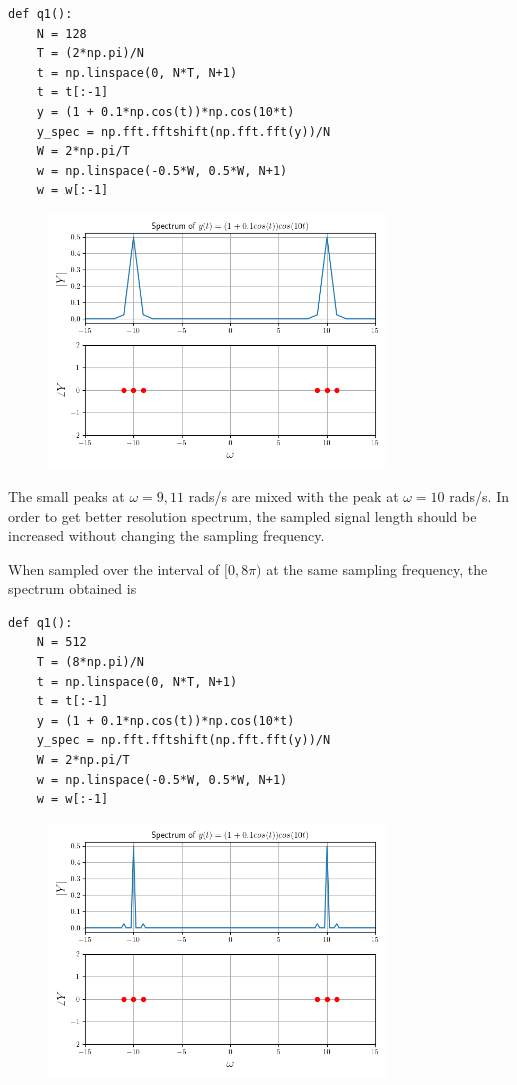 \documentclass[12pt, a4paper]{article}
\begin{document}
\begin{lstlisting}
def q1():
    N = 128
    T = (2*np.pi)/N
    t = np.linspace(0, N*T, N+1)
    t = t[:-1]
    y = (1 + 0.1*np.cos(t))*np.cos(10*t)
    y_spec = np.fft.fftshift(np.fft.fft(y))/N
    W = 2*np.pi/T
    w = np.linspace(-0.5*W, 0.5*W, N+1)
    w = w[:-1]
\end{lstlisting}

\begin{figure}[H]
\centering
\includegraphics[width=0.8\textwidth]{q1cos.png}
\end{figure}

The small peaks at $\omega = 9, 11$ rads/s are mixed with the peak at $\omega = 10$ rads/s. In order to get better resolution spectrum, the sampled signal length should be increased without changing the sampling frequency.

When sampled over the interval of $[0, 8\pi)$ at the same sampling frequency, the spectrum obtained is

\begin{lstlisting}
def q1():
    N = 512
    T = (8*np.pi)/N
    t = np.linspace(0, N*T, N+1)
    t = t[:-1]
    y = (1 + 0.1*np.cos(t))*np.cos(10*t)
    y_spec = np.fft.fftshift(np.fft.fft(y))/N
    W = 2*np.pi/T
    w = np.linspace(-0.5*W, 0.5*W, N+1)
    w = w[:-1]
\end{lstlisting}

\begin{figure}[H]
\centering
\includegraphics[width=0.8\textwidth]{q1cos1.png}
\end{figure}
\end{document}
